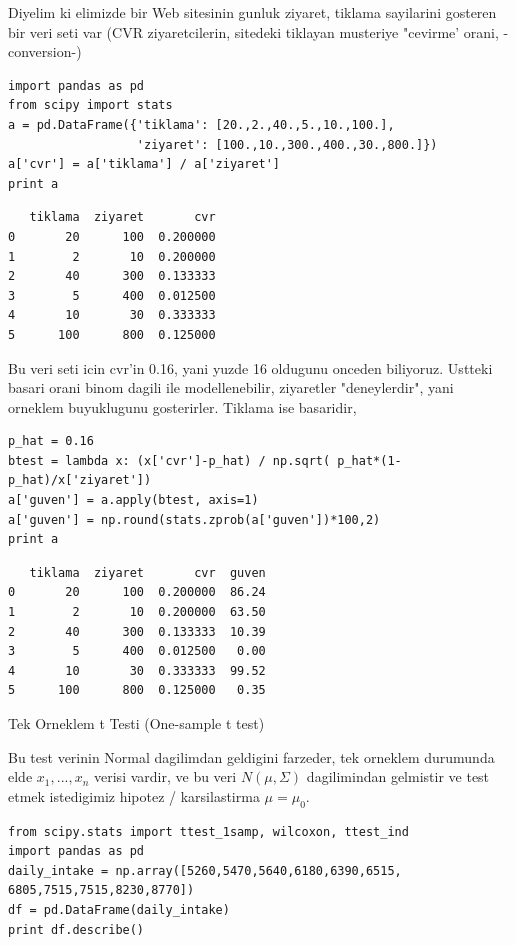 \documentclass[12pt,fleqn]{article}\usepackage{../common}
\begin{document}
Diyelim ki elimizde bir Web sitesinin gunluk ziyaret, tiklama sayilarini
gosteren bir veri seti var (CVR ziyaretcilerin, sitedeki tiklayan musteriye
"cevirme' orani, -conversion-)

\begin{verbatim}
import pandas as pd
from scipy import stats
a = pd.DataFrame({'tiklama': [20.,2.,40.,5.,10.,100.],
                  'ziyaret': [100.,10.,300.,400.,30.,800.]})
a['cvr'] = a['tiklama'] / a['ziyaret'] 
print a
\end{verbatim}

\begin{verbatim}
   tiklama  ziyaret       cvr
0       20      100  0.200000
1        2       10  0.200000
2       40      300  0.133333
3        5      400  0.012500
4       10       30  0.333333
5      100      800  0.125000
\end{verbatim}

Bu veri seti icin cvr'in 0.16, yani yuzde 16 oldugunu onceden
biliyoruz. Ustteki basari orani binom dagili ile modellenebilir, ziyaretler
"deneylerdir", yani orneklem buyuklugunu gosterirler. Tiklama ise
basaridir,

\begin{verbatim}
p_hat = 0.16
btest = lambda x: (x['cvr']-p_hat) / np.sqrt( p_hat*(1-p_hat)/x['ziyaret'])
a['guven'] = a.apply(btest, axis=1)
a['guven'] = np.round(stats.zprob(a['guven'])*100,2)
print a
\end{verbatim}

\begin{verbatim}
   tiklama  ziyaret       cvr  guven
0       20      100  0.200000  86.24
1        2       10  0.200000  63.50
2       40      300  0.133333  10.39
3        5      400  0.012500   0.00
4       10       30  0.333333  99.52
5      100      800  0.125000   0.35
\end{verbatim}

Tek Orneklem t Testi (One-sample t test)

Bu test verinin Normal dagilimdan geldigini farzeder, tek orneklem
durumunda elde $x_1,...,x_n$ verisi vardir, ve bu veri $N(\mu,\Sigma)$
dagilimindan gelmistir ve test etmek istedigimiz hipotez /
karsilastirma $\mu = \mu_0$. 

\begin{verbatim}
from scipy.stats import ttest_1samp, wilcoxon, ttest_ind
import pandas as pd
daily_intake = np.array([5260,5470,5640,6180,6390,6515, 6805,7515,7515,8230,8770])
df = pd.DataFrame(daily_intake)
print df.describe()
\end{verbatim}
\end{document}
